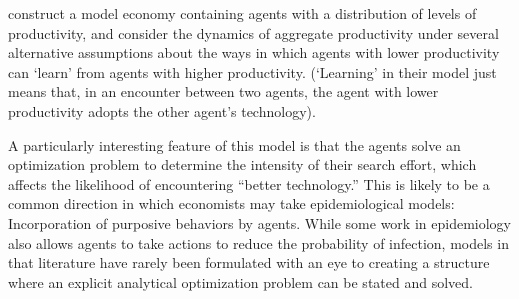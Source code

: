 \cite{lucas2014knowledge} construct a model economy containing agents with a distribution of levels of productivity, and consider the dynamics of aggregate productivity under several alternative assumptions about the ways in which agents with lower productivity can `learn' from agents with higher productivity.  (`Learning' in their model just means that, in an encounter between two agents, the agent with lower productivity adopts the other agent's technology).  %

A particularly interesting feature of this model is that the agents solve an optimization problem to determine the intensity of their search effort, which affects the likelihood of encountering ``better technology.''  %
This is likely to be a common direction in which economists may take epidemiological models: Incorporation of purposive behaviors by agents. While some work in epidemiology also allows agents to take actions to reduce the probability of infection, models in that literature have rarely been formulated with an eye to creating a structure where an explicit analytical optimization problem can be stated and solved.


